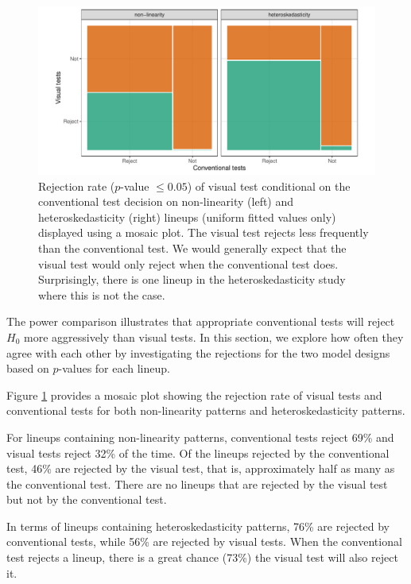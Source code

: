 \documentclass[]{interact}
\theoremstyle{plain}%
\theoremstyle{definition}
\theoremstyle{remark}
\begin{document}
\begin{figure}

{\centering \includegraphics[width=1\linewidth]{paper_comparison_files/figure-latex/p-value-comparison-1} 

}

\caption{Rejection rate ($p$-value $\leq0.05$) of visual test conditional on the conventional test decision on non-linearity (left) and heteroskedasticity (right) lineups (uniform fitted values only) displayed using a mosaic plot. The visual test rejects less frequently than the conventional test. We would generally expect that the visual test would only reject when the conventional test does. Surprisingly, there is one lineup in the heteroskedasticity study where this is not the case. }\label{fig:p-value-comparison}
\end{figure}

The power comparison illustrates that appropriate conventional tests
will reject \(H_0\) more aggressively than visual tests. In this
section, we explore how often they agree with each other by
investigating the rejections for the two model designs based on
\(p\)-values for each lineup.

Figure \ref{fig:p-value-comparison} provides a mosaic plot showing the
rejection rate of visual tests and conventional tests for both
non-linearity patterns and heteroskedasticity patterns.

For lineups containing non-linearity patterns, conventional tests reject
69\% and visual tests reject 32\% of the time. Of the lineups rejected
by the conventional test, 46\% are rejected by the visual test, that is,
approximately half as many as the conventional test. There are no
lineups that are rejected by the visual test but not by the conventional
test.

In terms of lineups containing heteroskedasticity patterns, 76\% are
rejected by conventional tests, while 56\% are rejected by visual tests.
When the conventional test rejects a lineup, there is a great chance
(73\%) the visual test will also reject it.
\end{document}

